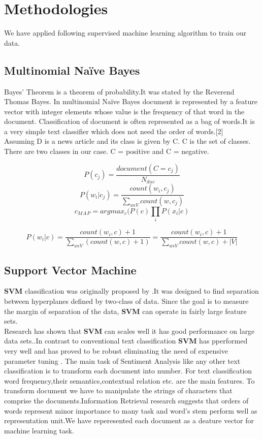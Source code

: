 \documentclass[a4paper,12pt]{report}
\begin{document}
\section{Methodologies}
We have applied following supervised machine learning algorithm to train our data.

\subsection{Multinomial Naïve Bayes}
Bayes' Theorem is a theorem of probability.It was stated by the Reverend Thomas Bayes.
In multinomial Naïve Bayes document is represented by a feature vector with integer elements whose value is the frequency of that word in the document.
Classification of document is often represented as a bag of words.It is a very simple text classifier which does not need the order of words.[2]\\
Assuming D is a news article and its class is given by C. C is the set of classes. There are two classes in our case. C = positive and C = negative. 



\[ P(c_j) = \frac{document(C=c_j)}{N_d{}_o{}_c}\]
\[P(w_i|c_j) = \frac{count(w_i,c_j)}{\sum_{w \epsilon V} count(w,c_j)}\]
\[c_M{}_A{}_P = argmax_c( P(c) \prod_i P(x_i|c)\]

\[P(w_i|c) = \frac{count(w_i,c)+1}{\sum_{w \epsilon V} (count(w,c)+1)}=\frac{count(w_i,c)+1}{\sum_{w \epsilon V} count(w,c)+|V|}\]

\subsection{Support Vector Machine}

\citep{basu2003support} \textbf{SVM} classification was originally proposed by \citep{vapnik2013nature}  \citep{cortes1995support}.It was designed to find separation between hyperplanes defined by two-class of data.
Since the goal is to measure the margin of separation of the data, \textbf{SVM} can operate in fairly large feature sets.\\
Research has shown that \textbf{SVM} can scales well it has good performance on large data sets.\citep{kwok1998automated}.In contrast to conventional text classification \textbf{SVM} has pperformed very well and has proved to be robust eliminating the need of expensive parameter tuning  \citep{joachims1998text}. The main task of Sentiment Analysis like any other text classification is to transform each document into number. For text classification word frequency,their semantics,contextual relation etc. are the main features. To transform document we have to manipulate the strings of characters that comprise the documents.Information Retrieval research \citep{joachims1998text}suggests that orders of words represent minor importance to many task and word's stem perform well as representation unit.We have reperesented each document as a deature vector for machine learning task.
\end{document}
